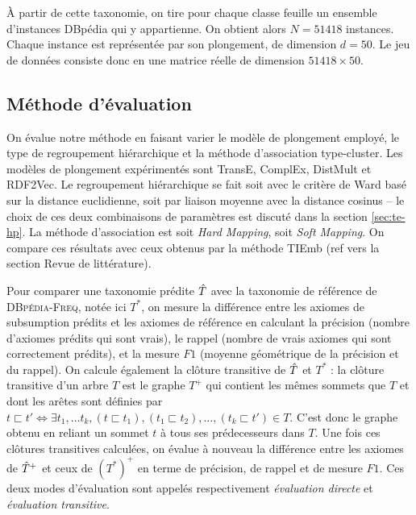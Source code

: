 À partir de cette taxonomie, on tire pour chaque classe feuille un ensemble d'instances DBpédia qui y appartienne. On obtient alors $N=51 418$  instances. Chaque instance est représentée par son plongement, de dimension $d=50$. Le jeu de données consiste donc en une matrice réelle de dimension $51 418 \times 50$.


\subsection{Méthode d'évaluation}
\label{subsec:te-evaluation}

On évalue notre méthode en faisant varier le modèle de plongement employé, le type de regroupement hiérarchique et la méthode d'association type-cluster. Les modèles de plongement expérimentés sont TransE, ComplEx, DistMult et RDF2Vec. Le regroupement hiérarchique se fait soit avec le critère de Ward basé sur la distance euclidienne, soit par liaison moyenne avec la distance cosinus – le choix de ces deux combinaisons de paramètres est discuté dans la section \ref{sec:te-hp}. La méthode d'association est soit \textit{Hard Mapping}, soit \textit{Soft Mapping}. On compare ces résultats avec ceux obtenus par la méthode TIEmb (ref vers la section Revue de littérature). 

Pour comparer une taxonomie prédite $\hat{T}$ avec la taxonomie de référence de \textsc{DBpédia-Freq}, notée ici $T^*$, on mesure la différence entre les axiomes de subsumption prédits et les axiomes de référence en calculant la précision (nombre d'axiomes prédits qui sont vrais), le rappel (nombre de vrais axiomes qui sont correctement prédits), et la mesure $F1$ (moyenne géométrique de la précision et du rappel). On calcule également la clôture transitive de $\hat{T}$ et $T^*$ : la clôture transitive d'un arbre $T$ est le graphe $T^+$ qui contient les mêmes sommets que $T$ et dont les arêtes sont définies par $t \sqsubset t' \iff \exists t_1, \ldots t_k, (t \sqsubset t_1), (t_1 \sqsubset t_2), \ldots, (t_k \sqsubset t') \in T$. C'est donc le graphe obtenu en reliant un sommet $t$ à tous ses prédecesseurs dans $T$. Une fois ces clôtures transitives calculées, on évalue à nouveau la différence entre les axiomes de $\hat{T}^+$ et ceux de $(T^*)^+$ en terme de précision, de rappel et de mesure $F1$. Ces deux modes d'évaluation sont appelés respectivement \textit{évaluation directe} et \textit{évaluation transitive}.


